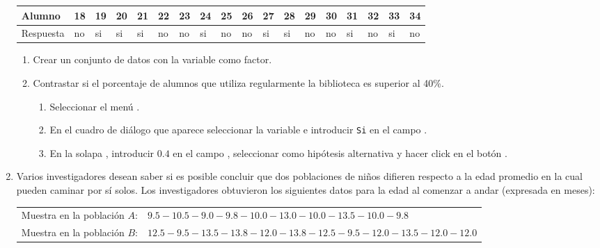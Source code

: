 \begin{enumerate}[leftmargin=*]
\begin{flushleft}
\begin{tabular}{|l|l|l|l|l|l|l|l|l|l|l|l|l|l|l|l|l|l|}
\hline
Alumno & 18 & 19 & 20 & 21 & 22 & 23 & 24 & 25 & 26 & 27 & 28 & 29 & 30 & 31 & 32 & 33 & 34 \\
\hline
Respuesta & no & si & si & si & no & no & si & no & no & si & si & no & no & si & no & si & no \\
\hline
\end{tabular}
\end{flushleft}

\begin{enumerate}
\item Crear un conjunto de datos con la variable  como factor.

\item Contrastar si el porcentaje de alumnos que utiliza regularmente la biblioteca es superior al 40\%. 
\begin{indicacion}{
\begin{enumerate}
\item Seleccionar el menú .
\item En el cuadro de diálogo que aparece seleccionar la variable  e introducir \texttt{Si} en el campo .
\item En la solapa , introducir $0.4$ en el campo , seleccionar como
hipótesis alternativa  y hacer click en el botón .
\end{enumerate}
}
\end{indicacion}
\end{enumerate}

\item Varios investigadores desean saber si es posible concluir que dos poblaciones de niños difieren respecto a la edad
promedio en la cual pueden caminar por sí solos.
Los investigadores obtuvieron los siguientes datos para la edad al comenzar a andar (expresada en meses):
\begin{center}
\begin{tabular}{ll}
Muestra en la población $A$: & $9.5-10.5-9.0-9.8-10.0-13.0-10.0-13.5-10.0-9.8$\\
Muestra en la población $B$: & $12.5-9.5-13.5-13.8-12.0-13.8-12.5-9.5-12.0-13.5-12.0-12.0$
\end{tabular}
\end{center}


\end{enumerate}
